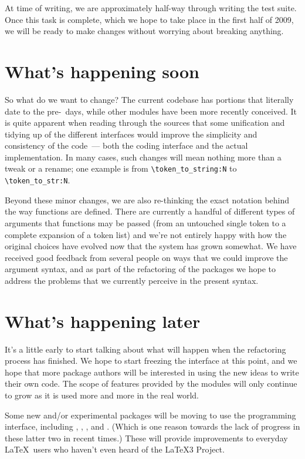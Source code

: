 \documentclass{ltnews}
\begin{document}
At time of writing, we are approximately half-way through writing the test
suite. Once this task is complete, which we hope to take place in the first
half of 2009, we will be ready to make changes without worrying about breaking
anything.

\section{What's happening soon}

So what do we want to change? The current  codebase has
portions that literally date to the pre-\LaTeXe\ days, while other modules
have been more recently conceived. It is quite apparent when reading through
the sources that some unification and tidying up of the different interfaces
would improve the simplicity and consistency of the code~--- both the coding
interface and the actual implementation. In many cases, such changes will mean
nothing more than a tweak or a rename; one example is from
\verb=\token_to_string:N= to \verb=\token_to_str:N=.

Beyond these minor changes, we are also re-thinking the exact notation behind
the way functions are defined. There are currently a handful of different
types of arguments that functions may be passed (from an untouched single
token to a complete expansion of a token list) and we're not entirely happy
with how the original choices have evolved now that the system has grown
somewhat. We have received good feedback from several people on ways that we
could improve the argument syntax, and as part of the refactoring of the
 packages we hope to address the problems that we currently
perceive in the present syntax.

\section{What's happening later}

It's a little early to start talking about what will happen when the
refactoring process has finished. We hope to start freezing the interface at
this point, and we hope that more package authors will be interested in using
the new ideas to write their own code. The scope of features provided by the
 modules will only continue to grow as it is used more and more
in the real world.

Some new and/or experimental packages will be moving to use the
 programming interface, including ,
, , and . (Which is
one reason towards the lack of progress in these latter two in recent times.)
These will provide improvements to everyday \LaTeX\ users who haven't even
heard of the \LaTeX3 Project.
\end{document}
